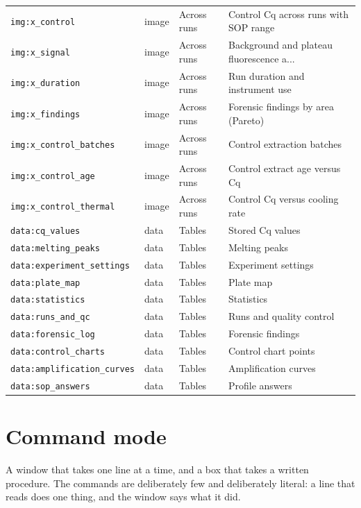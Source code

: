{\begin{xltabular}{\linewidth}{|X|X|X|X|}
\texttt{img:x\_control} & image & Across runs & Control Cq across runs with SOP range \\
\texttt{img:x\_signal} & image & Across runs & Background and plateau fluorescence a... \\
\texttt{img:x\_duration} & image & Across runs & Run duration and instrument use \\
\texttt{img:x\_findings} & image & Across runs & Forensic findings by area (Pareto) \\
\texttt{img:x\_control\_batches} & image & Across runs & Control extraction batches \\
\texttt{img:x\_control\_age} & image & Across runs & Control extract age versus Cq \\
\texttt{img:x\_control\_thermal} & image & Across runs & Control Cq versus cooling rate \\
\texttt{data:cq\_values} & data & Tables & Stored Cq values \\
\texttt{data:melting\_peaks} & data & Tables & Melting peaks \\
\texttt{data:experiment\_settings} & data & Tables & Experiment settings \\
\texttt{data:plate\_map} & data & Tables & Plate map \\
\texttt{data:statistics} & data & Tables & Statistics \\
\texttt{data:runs\_and\_qc} & data & Tables & Runs and quality control \\
\texttt{data:forensic\_log} & data & Tables & Forensic findings \\
\texttt{data:control\_charts} & data & Tables & Control chart points \\
\texttt{data:amplification\_curves} & data & Tables & Amplification curves \\
\texttt{data:sop\_answers} & data & Tables & Profile answers \\
\bottomrule
\end{xltabular}}


\section{Command mode}
A window that takes one line at a time, and a box that takes a written procedure.
The commands are deliberately few and deliberately literal: a line that reads
 does one thing, and the window says what it did.


